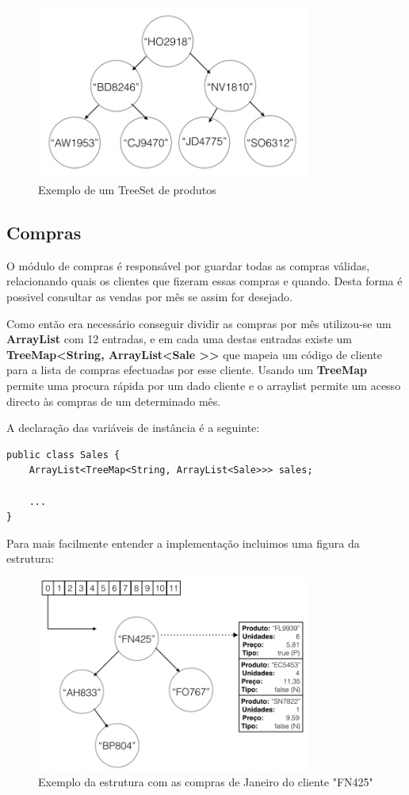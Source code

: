\documentclass[10pt] {article}
\begin{document}
\begin{figure}[ht!]
\centering
\includegraphics[width=90mm]{catprodutos.png}
\caption{Exemplo de um TreeSet de produtos}
\label{fig:catprodutos}
\end{figure}

\subsection{Compras\label{compras}}

O módulo de compras é responsável por guardar todas as compras válidas, relacionando quais os clientes que fizeram essas compras e quando.
Desta forma é possivel consultar as vendas por mês se assim for desejado.

Como então era necessário conseguir dividir as compras por mês utilizou-se um \color{blue} \textbf{ArrayList} \color{black} com 
12 entradas, e em cada uma destas entradas existe um \color{blue} \textbf{TreeMap\textless String, ArrayList\textless Sale
\textgreater\textgreater} \color{black} que mapeia um código de cliente para a lista de compras efectuadas por esse cliente.
Usando um \color{blue} \textbf{TreeMap} \color{black} permite uma procura rápida por um dado cliente e o arraylist permite um 
acesso directo às compras de um determinado mês.

A declaração das variáveis de instância é a seguinte:

\begin{lstlisting}
public class Sales {
	ArrayList<TreeMap<String, ArrayList<Sale>>> sales;

	...
}
\end{lstlisting}

Para mais facilmente entender a implementação incluimos uma figura da estrutura:

\begin{figure}[ht!]
\centering
\includegraphics[width=90mm]{sales.png}
\caption{Exemplo da estrutura com as compras de Janeiro do cliente "FN425"}
\label{fig:sales}
\end{figure}
\end{document}
